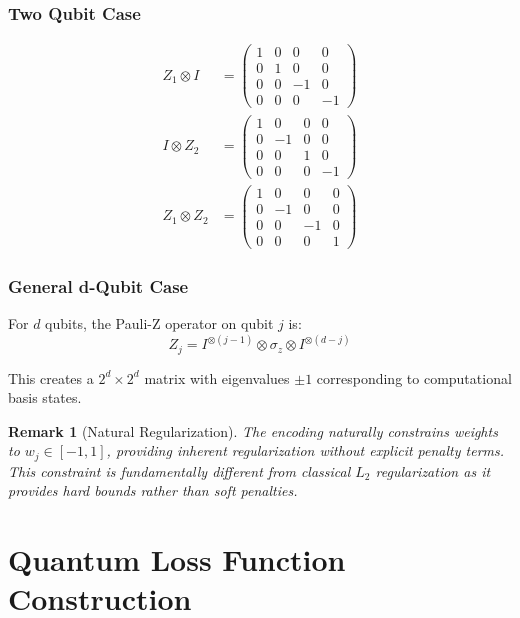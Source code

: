 \documentclass[11pt]{article}
\newtheorem{remark}[theorem]{Remark}
\begin{document}
\subsubsection{Two Qubit Case}
\begin{align}
Z_1 \otimes I &= \begin{pmatrix} 1 & 0 & 0 & 0 \\ 0 & 1 & 0 & 0 \\ 0 & 0 & -1 & 0 \\ 0 & 0 & 0 & -1 \end{pmatrix} \\
I \otimes Z_2 &= \begin{pmatrix} 1 & 0 & 0 & 0 \\ 0 & -1 & 0 & 0 \\ 0 & 0 & 1 & 0 \\ 0 & 0 & 0 & -1 \end{pmatrix} \\
Z_1 \otimes Z_2 &= \begin{pmatrix} 1 & 0 & 0 & 0 \\ 0 & -1 & 0 & 0 \\ 0 & 0 & -1 & 0 \\ 0 & 0 & 0 & 1 \end{pmatrix}
\label{eq:tensor_products}
\end{align}

\subsubsection{General d-Qubit Case}

For $d$ qubits, the Pauli-Z operator on qubit $j$ is:
\begin{equation}
Z_j = I^{\otimes (j-1)} \otimes \sigma_z \otimes I^{\otimes (d-j)}
\end{equation}

This creates a $2^d \times 2^d$ matrix with eigenvalues $\pm 1$ corresponding to computational basis states.

\begin{remark}[Natural Regularization]
The encoding naturally constrains weights to $w_j \in [-1, 1]$, providing inherent regularization without explicit penalty terms. This constraint is fundamentally different from classical $L_2$ regularization as it provides hard bounds rather than soft penalties.
\end{remark}

\section{Quantum Loss Function Construction}
\end{document}
